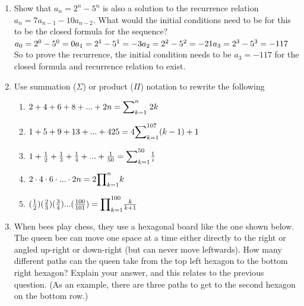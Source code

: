 \documentclass[11pt,a4paper]{article}
\newcommand\setItemNumber[1]{\setcounter{enumi}{\numexpr#1-1\relax}}
\begin{document}
\begin{enumerate}
            \setItemNumber{10}
        \item Show that $a_n = 2^n - 5^n$ is also a solution to the recurrence relation $a_n = {7a_{n - 1}} - {10a_{n - 2}}$. What would the initial conditions need to be for this to be the closed formula for the sequence?\\
            $a_0 = 2^0 - 5^0 = 0\\a_1 = 2^1 - 5^1 = -3\\a_2 = 2^2 - 5^2 = -21\\a_3 = 2^3 - 5^3 = -117$\\
            So to prove the recurrence, the initial condition needs to be $a_3 = -117$ for the closed formula and recurrence relation to exist.


            \setItemNumber{13}
        \item Use summation ($\Sigma$) or product ($\Pi$) notation to rewrite the following
            \begin{enumerate}

                \item $2 + 4 + 6 + 8 + ... + 2n\\\\ = {\mathlarger{\sum}}_{k=1}^{n}\;2k$\\
                \item $1 + 5 + 9 + 13 + ... + 425\\\\ = 4{\mathlarger{\sum}}_{k=1}^{107}(k-1)+1$\\
                \item $1 + \frac{1}{2} + \frac{1}{3} + \frac{1}{4} + ... + \frac{1}{50}\\\\= {\mathlarger{\sum}}_{k=1}^{50}\frac{1}{i}$\\
                    \item $2\cdot 4\cdot 6\cdot ... \cdot2n\\\\= 2{\mathlarger{\prod}}_{k=1}^n k$\\
                    \item $(\frac{1}{2})(\frac{2}{3})(\frac{3}{4})...(\frac{100}{101})\\\\={\mathlarger{\prod}}_{k=1}^{100}\frac{k}{k+1}$
            \end{enumerate}

            \setItemNumber{18}
            \item When bees play chess, they use a hexagonal board like the one shown below. The queen bee can move one space at a time either directly to the right or angled up-right or down-right (but can never move leftwards). How many different paths can the queen take from the top left hexagon to the bottom right hexagon? Explain your answer, and this relates to the previous question. (As an example, there are three paths to get to the second hexagon on the bottom row.)


\end{enumerate}
\end{document}
